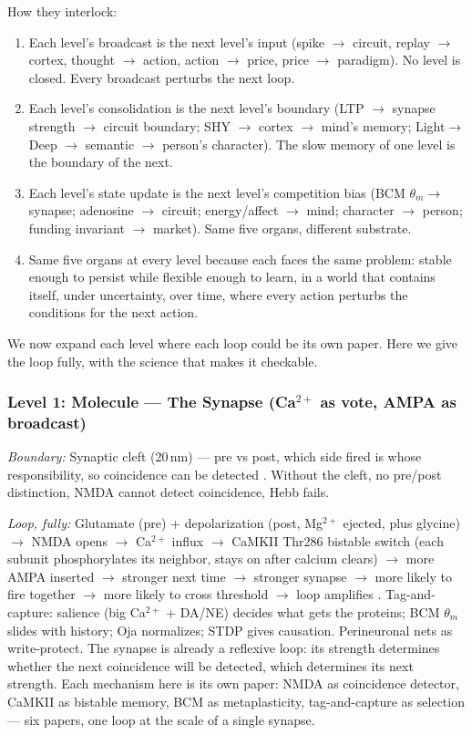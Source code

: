 \documentclass[11pt]{article}
\begin{document}
How they interlock:
\begin{enumerate}
\item Each level's broadcast is the next level's input (spike $\to$ circuit, replay $\to$ cortex, thought $\to$ action, action $\to$ price, price $\to$ paradigm). No level is closed. Every broadcast perturbs the next loop.
\item Each level's consolidation is the next level's boundary (LTP $\to$ synapse strength $\to$ circuit boundary; SHY $\to$ cortex $\to$ mind's memory; Light$\to$Deep $\to$ semantic $\to$ person's character). The slow memory of one level is the boundary of the next.
\item Each level's state update is the next level's competition bias (BCM $\theta_m \to$ synapse; adenosine $\to$ circuit; energy/affect $\to$ mind; character $\to$ person; funding invariant $\to$ market). Same five organs, different substrate.
\item Same five organs at every level because each faces the same problem: stable enough to persist while flexible enough to learn, in a world that contains itself, under uncertainty, over time, where every action perturbs the conditions for the next action.
\end{enumerate}

We now expand each level where each loop could be its own paper. Here we give the loop fully, with the science that makes it checkable.

\subsubsection{Level 1: Molecule --- The Synapse (Ca$^{2+}$ as vote, AMPA as broadcast)}

\textit{Boundary:} Synaptic cleft (20\,nm) --- pre vs post, which side fired is whose responsibility, so coincidence can be detected \citep{tononi2014}. Without the cleft, no pre/post distinction, NMDA cannot detect coincidence, Hebb fails.

\textit{Loop, fully:} Glutamate (pre) + depolarization (post, Mg$^{2+}$ ejected, plus glycine) $\to$ NMDA opens $\to$ Ca$^{2+}$ influx $\to$ CaMKII Thr286 bistable switch (each subunit phosphorylates its neighbor, stays on after calcium clears) $\to$ more AMPA inserted $\to$ stronger next time $\to$ stronger synapse $\to$ more likely to fire together $\to$ more likely to cross threshold $\to$ loop amplifies \citep{tononi2014}. Tag-and-capture: salience (big Ca$^{2+}$ + DA/NE) decides what gets the proteins; BCM $\theta_m$ slides with history; Oja normalizes; STDP gives causation. Perineuronal nets as write-protect. The synapse is already a reflexive loop: its strength determines whether the next coincidence will be detected, which determines its next strength. Each mechanism here is its own paper: NMDA as coincidence detector, CaMKII as bistable memory, BCM as metaplasticity, tag-and-capture as selection --- six papers, one loop at the scale of a single synapse.
\end{document}
